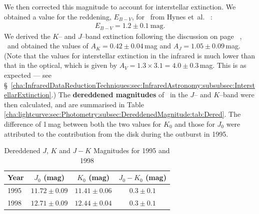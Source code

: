 We then corrected this magnitude to account for interstellar extinction. We obtained a value for the reddening, $E_{B-V}$, for \groj\ from Hynes et~al.\ %
\citeyear{Hynes_et_al.:1998}: %
\begin{eqnarray} \label{cha:lightcurve:sec:Photometry:subsec:DereddenedMagnitude:eqn:EBV}
E_{B-V} = 1.2\pm0.1 \ \mathrm{mag}.
\end{eqnarray}
We derived the $K$-- and $J$--band extinction following the discussion on page~%
\pageref{cha:InfraredDataReductionTechniques:sec:Photometry:subsec:DereddenedMagnitude:eqn:CardelliAK},%
\ and obtained the values of $A_{K} = 0.42\pm0.04$\,mag and $A_{J} = 1.05\pm0.09$\,mag. (Note that the values for interstellar extinction in the infrared is much lower than that in the optical, which is given by $A_{V} = 1.3\times3.1=4.0\pm0.3$\,mag. This is as expected --- see \S~\vref{cha:InfraredDataReductionTechniques:sec:InfraredAstronomy:subsubsec:InterstellarExtinction}.) The \textbf{dereddened magnitudes} %
of \groj\ in the $J$-- and $K$--band were then calculated, and are summarised in Table~%
\vref{cha:lightcurve:sec:Photometry:subsec:DereddenedMagnitude:tab:Dered}.
The difference of 1\,mag between both the two values for $K_0$ and those
for $J_0$ were attributed to the contribution from the disk during
the outburst in 1995. %

\begin{table}[htb]
\caption{Dereddened $J$, $K$ and $J-K$ Magnitudes for 1995 and 1998}\label{cha:lightcurve:sec:Photometry:subsec:DereddenedMagnitude:tab:Dered}

\begin{minipage}{\linewidth}
\renewcommand{\thefootnote}{\thempfootnote}

\begin{center}
\begin{tabular}{|l||||c|c|c|}

\hline
Year & $J_0$ (mag)& $K_0$ (mag)& $J_{0}-K_{0}$ (mag) \\\hline\hline\hline\hline
1995 & $11.72\pm0.09$ & $11.41\pm0.06$ & $0.3\pm0.1$ \\\hline
1998 & $12.71\pm0.09$ & $12.44\pm0.04$ & $0.3\pm0.1$ \\\hline
\hline
\end{tabular}
\end{center}
\end{minipage}
\end{table}

\vspace{\myparskip}

